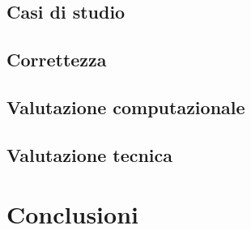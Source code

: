 \documentclass[Lau,binding=0.6cm]{sapthesis}
\begin{document}
\section{Casi di studio}

\section{Correttezza}

\section{Valutazione computazionale}

\section{Valutazione tecnica}

\chapter{Conclusioni}

\backmatter
\end{document}
